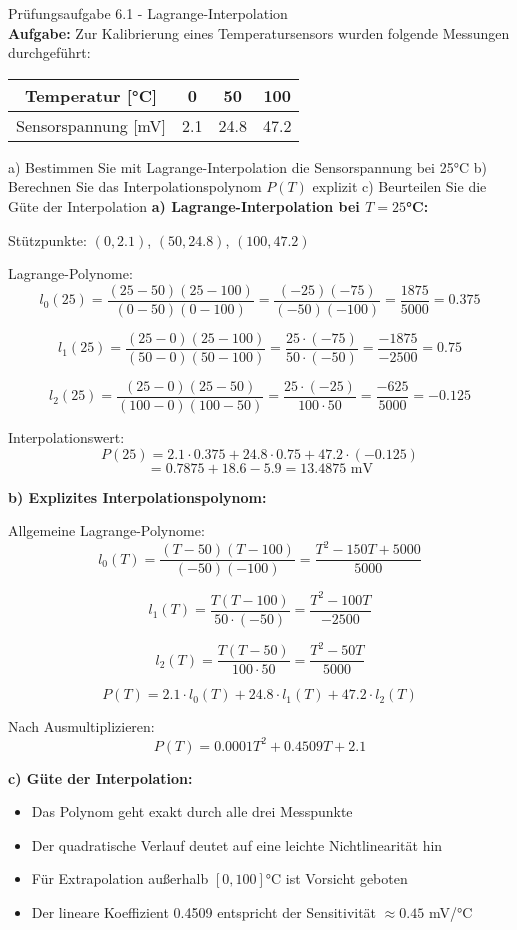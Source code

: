 \begin{example2}{Prüfungsaufgabe 6.1 - Lagrange-Interpolation}\\
\textbf{Aufgabe:} Zur Kalibrierung eines Temperatursensors wurden folgende Messungen durchgeführt:

\begin{center}
\begin{tabular}{|c|c|c|c|}
\hline
Temperatur [°C] & 0 & 50 & 100 \\
\hline
Sensorspannung [mV] & 2.1 & 24.8 & 47.2 \\
\hline
\end{tabular}
\end{center}

a) Bestimmen Sie mit Lagrange-Interpolation die Sensorspannung bei 25°C
b) Berechnen Sie das Interpolationspolynom $P(T)$ explizit
c) Beurteilen Sie die Güte der Interpolation
\tcblower
\textbf{a) Lagrange-Interpolation bei $T = 25$°C:}

Stützpunkte: $(0, 2.1)$, $(50, 24.8)$, $(100, 47.2)$

Lagrange-Polynome:
$$l_0(25) = \frac{(25-50)(25-100)}{(0-50)(0-100)} = \frac{(-25)(-75)}{(-50)(-100)} = \frac{1875}{5000} = 0.375$$

$$l_1(25) = \frac{(25-0)(25-100)}{(50-0)(50-100)} = \frac{25 \cdot (-75)}{50 \cdot (-50)} = \frac{-1875}{-2500} = 0.75$$

$$l_2(25) = \frac{(25-0)(25-50)}{(100-0)(100-50)} = \frac{25 \cdot (-25)}{100 \cdot 50} = \frac{-625}{5000} = -0.125$$

Interpolationswert:
$$P(25) = 2.1 \cdot 0.375 + 24.8 \cdot 0.75 + 47.2 \cdot (-0.125)$$ 
$$ = 0.7875 + 18.6 - 5.9 = 13.4875 \text{ mV}$$

\textbf{b) Explizites Interpolationspolynom:}

Allgemeine Lagrange-Polynome:
$$l_0(T) = \frac{(T-50)(T-100)}{(-50)(-100)} = \frac{T^2 - 150T + 5000}{5000}$$

$$l_1(T) = \frac{T(T-100)}{50 \cdot (-50)} = \frac{T^2 - 100T}{-2500}$$

$$l_2(T) = \frac{T(T-50)}{100 \cdot 50} = \frac{T^2 - 50T}{5000}$$

$$P(T) = 2.1 \cdot l_0(T) + 24.8 \cdot l_1(T) + 47.2 \cdot l_2(T)$$

Nach Ausmultiplizieren:
$$P(T) = 0.0001T^2 + 0.4509T + 2.1$$

\textbf{c) Güte der Interpolation:}
\begin{itemize}
    \item Das Polynom geht exakt durch alle drei Messpunkte
    \item Der quadratische Verlauf deutet auf eine leichte Nichtlinearität hin
    \item Für Extrapolation außerhalb $[0, 100]$°C ist Vorsicht geboten
    \item Der lineare Koeffizient 0.4509 entspricht der Sensitivität $\approx 0.45$ mV/°C
\end{itemize}
\end{example2}

